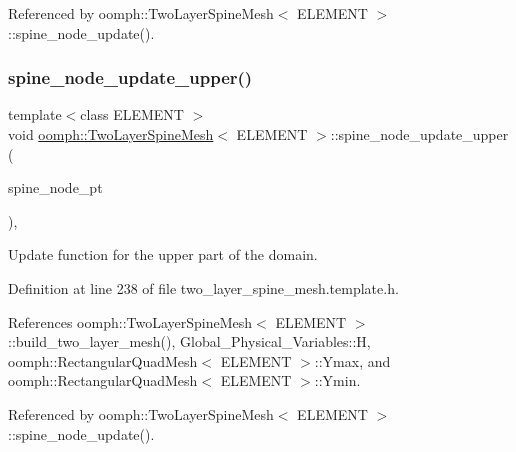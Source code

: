 Referenced by oomph\+::\+Two\+Layer\+Spine\+Mesh$<$ E\+L\+E\+M\+E\+N\+T $>$\+::spine\+\_\+node\+\_\+update().

\mbox{\label{classoomph_1_1TwoLayerSpineMesh_adc173b7505ec801a4aa688f97ffe55e0}} 
\subsubsection{\texorpdfstring{spine\+\_\+node\+\_\+update\+\_\+upper()}{spine\_node\_update\_upper()}}
{\footnotesize\ttfamily template$<$class E\+L\+E\+M\+E\+NT $>$ \\
void \hyperlink{classoomph_1_1TwoLayerSpineMesh}{oomph\+::\+Two\+Layer\+Spine\+Mesh}$<$ E\+L\+E\+M\+E\+NT $>$\+::spine\+\_\+node\+\_\+update\+\_\+upper (\begin{DoxyParamCaption}\item[{Spine\+Node $\ast$}]{spine\+\_\+node\+\_\+pt }\end{DoxyParamCaption})\hspace{0.3cm}{\ttfamily [inline]}, {\ttfamily [protected]}}



Update function for the upper part of the domain. 



Definition at line 238 of file two\+\_\+layer\+\_\+spine\+\_\+mesh.\+template.\+h.



References oomph\+::\+Two\+Layer\+Spine\+Mesh$<$ E\+L\+E\+M\+E\+N\+T $>$\+::build\+\_\+two\+\_\+layer\+\_\+mesh(), Global\+\_\+\+Physical\+\_\+\+Variables\+::H, oomph\+::\+Rectangular\+Quad\+Mesh$<$ E\+L\+E\+M\+E\+N\+T $>$\+::\+Ymax, and oomph\+::\+Rectangular\+Quad\+Mesh$<$ E\+L\+E\+M\+E\+N\+T $>$\+::\+Ymin.



Referenced by oomph\+::\+Two\+Layer\+Spine\+Mesh$<$ E\+L\+E\+M\+E\+N\+T $>$\+::spine\+\_\+node\+\_\+update().

\mbox{\label{classoomph_1_1TwoLayerSpineMesh_a36680574d0c8f023206ce8ffe1a99b06}} 
